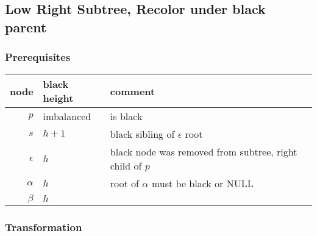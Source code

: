 \documentclass[a4paper,10pt,twoside]{article}
\begin{document}
\newpage
\subsection{Low Right Subtree, Recolor under black parent}

\subsubsection{Prerequisites}

\begin{center}
\begin{tabular}{|r||l|l|}
\hline
node		&	black height	&	comment	\\
\hline
\hline
$p$		&	imbalanced	&	is black	\\\hline
$s$		&	$h+1$	&	black sibling of $\epsilon$ root	\\\hline
$\epsilon$	&	$h$	&	black node was removed from subtree, right child of $p$	\\\hline
$\alpha$	&	$h$	&	root of $\alpha$ must be black or NULL	\\\hline
$\beta$		&	$h$	&		\\\hline
\end{tabular}
\end{center}

\begin{center}
\end{center}

\subsubsection{Transformation}
\end{document}

